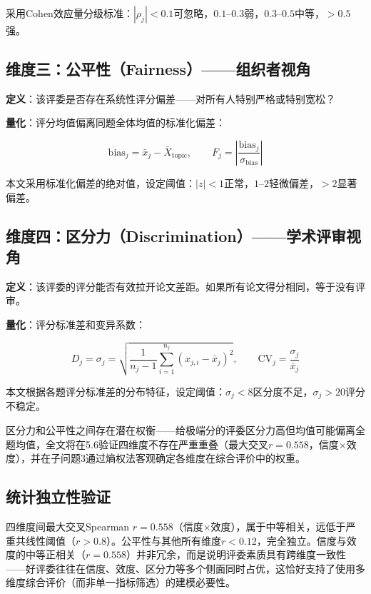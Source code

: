 \documentclass[UTF8,12pt]{ctexart}
\begin{document}
采用Cohen效应量分级标准：$|\rho_j| < 0.1$可忽略，$0.1$--$0.3$弱，$0.3$--$0.5$中等，$>0.5$强。

\subsection{维度三：公平性（Fairness）——组织者视角}

\textbf{定义}：该评委是否存在系统性评分偏差——对所有人特别严格或特别宽松？

\textbf{量化}：评分均值偏离同题全体均值的标准化偏差：

\begin{equation}
\text{bias}_j = \bar{x}_j - \bar{X}_{\text{topic}}, \qquad
F_j = \left|\frac{\text{bias}_j}{\sigma_{\text{bias}}}\right|
\end{equation}

本文采用标准化偏差的绝对值，设定阈值：$|z| < 1$正常，$1$--$2$轻微偏差，$>2$显著偏差。

\subsection{维度四：区分力（Discrimination）——学术评审视角}

\textbf{定义}：该评委的评分能否有效拉开论文差距。如果所有论文得分相同，等于没有评审。

\textbf{量化}：评分标准差和变异系数：

\begin{equation}
D_j = \sigma_j = \sqrt{\frac{1}{n_j-1}\sum_{i=1}^{n_j}(x_{j,i} - \bar{x}_j)^2}, \qquad
\text{CV}_j = \frac{\sigma_j}{\bar{x}_j}
\end{equation}

本文根据各题评分标准差的分布特征，设定阈值：$\sigma_j < 8$区分度不足，$\sigma_j > 20$评分不稳定。

区分力和公平性之间存在潜在权衡——给极端分的评委区分力高但均值可能偏离全题均值，全文将在5.6验证四维度不存在严重重叠（最大交叉$r=0.558$，信度$\times$效度），并在子问题3通过熵权法客观确定各维度在综合评价中的权重。

\subsection{统计独立性验证}

四维度间最大交叉Spearman $r = 0.558$（信度$\times$效度），属于中等相关，远低于严重共线性阈值（$r>0.8$）。公平性与其他所有维度$r < 0.12$，完全独立。信度与效度的中等正相关（$r=0.558$）并非冗余，而是说明评委素质具有跨维度一致性——好评委往往在信度、效度、区分力等多个侧面同时占优，这恰好支持了使用多维度综合评价（而非单一指标筛选）的建模必要性。
\end{document}
